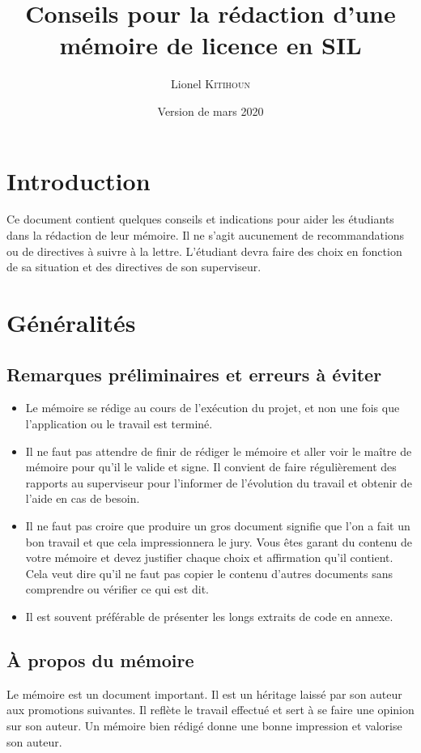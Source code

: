 \documentclass[12pt]{article}
\title{Conseils pour la rédaction d'une mémoire de licence en SIL}
\author{Lionel K\textsc{itihoun}}
\date{Version de mars 2020}
\begin{document}
\maketitle

\section*{Introduction}
Ce document contient quelques conseils et indications pour aider les étudiants dans la rédaction de leur mémoire. Il ne s'agit aucunement de recommandations ou de directives à suivre à la lettre. L'étudiant devra faire des choix en fonction de sa situation et des directives de son superviseur.

\section{Généralités}

\subsection{Remarques préliminaires et erreurs à éviter}
\begin{itemize}
  \item Le mémoire se rédige au cours de  l'exécution du projet, et non une fois que l'application ou le travail est terminé.
  \item Il ne faut pas attendre de finir de rédiger le mémoire et aller voir le maître de mémoire pour qu'il le valide et signe. Il convient de faire régulièrement des rapports au superviseur pour l'informer de l'évolution du travail et obtenir de l'aide en cas de besoin.
  \item Il ne faut pas croire que produire un gros document signifie que l'on a fait un bon travail et que cela impressionnera le jury. Vous êtes garant du contenu de votre mémoire et devez justifier chaque choix et affirmation qu'il contient. Cela veut dire qu'il ne faut pas copier le contenu d'autres documents sans comprendre ou vérifier ce qui est dit.
  \item Il est souvent préférable de présenter les longs extraits de code en annexe.
\end{itemize}

\subsection{\`A propos du mémoire}
Le mémoire est un document important. Il est un héritage laissé par son auteur aux promotions suivantes. Il reflète le travail effectué et sert à se faire une opinion sur son auteur. Un mémoire bien rédigé donne une bonne impression et valorise son auteur.
\end{document}
